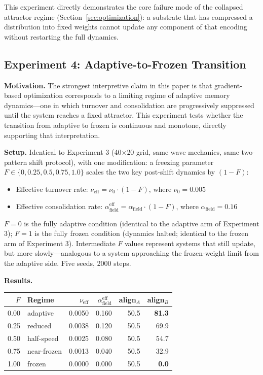 \documentclass[12pt]{article}
\begin{document}
This experiment directly demonstrates the core failure mode of the collapsed attractor regime (Section~\ref{sec:optimization}): a substrate that has compressed a distribution into fixed weights cannot update any component of that encoding without restarting the full dynamics.

\subsection{Experiment 4: Adaptive-to-Frozen Transition}
\label{sec:exp4}

\textbf{Motivation.} The strongest interpretive claim in this paper is that gradient-based optimization corresponds to a limiting regime of adaptive memory dynamics---one in which turnover and consolidation are progressively suppressed until the system reaches a fixed attractor. This experiment tests whether the transition from adaptive to frozen is continuous and monotone, directly supporting that interpretation.

\textbf{Setup.} Identical to Experiment 3 (40$\times$20 grid, same wave mechanics, same two-pattern shift protocol), with one modification: a freezing parameter $F \in \{0, 0.25, 0.5, 0.75, 1.0\}$ scales the two key post-shift dynamics by $(1-F)$:
\begin{itemize}
  \item Effective turnover rate: $\nu_{\text{eff}} = \nu_0 \cdot (1-F)$, where $\nu_0 = 0.005$
  \item Effective consolidation rate: $\alpha^{\text{eff}}_{\text{field}} = \alpha_{\text{field}} \cdot (1-F)$, where $\alpha_{\text{field}} = 0.16$
\end{itemize}
$F=0$ is the fully adaptive condition (identical to the adaptive arm of Experiment 3); $F=1$ is the fully frozen condition (dynamics halted; identical to the frozen arm of Experiment 3). Intermediate $F$ values represent systems that still update, but more slowly---analogous to a system approaching the frozen-weight limit from the adaptive side. Five seeds, 2000 steps.

\textbf{Results.}
\begin{center}
\begin{tabular}{rlrrrr}
\toprule
$F$ & Regime & $\nu_{\text{eff}}$ & $\alpha^{\text{eff}}_{\text{field}}$ & align$_A$ & align$_B$ \\
\midrule
0.00 & adaptive    & 0.0050 & 0.160 & 50.5 & \textbf{81.3} \\
0.25 & reduced     & 0.0038 & 0.120 & 50.5 & 69.9 \\
0.50 & half-speed  & 0.0025 & 0.080 & 50.5 & 54.7 \\
0.75 & near-frozen & 0.0013 & 0.040 & 50.5 & 32.9 \\
1.00 & frozen      & 0.0000 & 0.000 & 50.5 & \textbf{0.0} \\
\bottomrule
\end{tabular}
\end{center}
\end{document}
